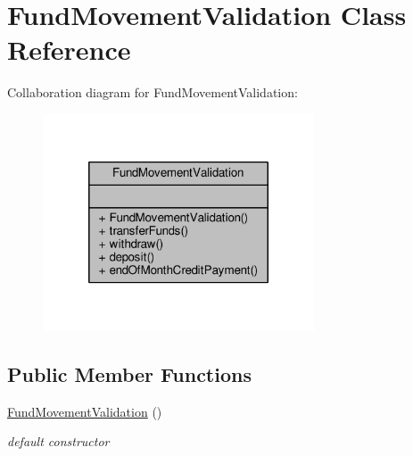 \hypertarget{classFundMovementValidation}{\section{Fund\-Movement\-Validation Class Reference}
\label{classFundMovementValidation}
}


Collaboration diagram for Fund\-Movement\-Validation\-:
\nopagebreak
\begin{figure}[H]
\begin{center}
\leavevmode
\includegraphics[width=228pt]{classFundMovementValidation__coll__graph}
\end{center}
\end{figure}
\subsection*{Public Member Functions}
\begin{DoxyCompactItemize}
\item 
\hyperlink{classFundMovementValidation_a77f3ec4e2f10391db28c8ab4ade75332}{Fund\-Movement\-Validation} ()
\begin{DoxyCompactList}\small\item\em default constructor \end{DoxyCompactList}\end{DoxyCompactItemize}
